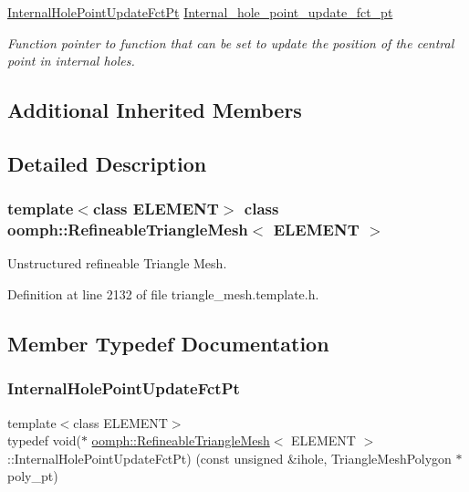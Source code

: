 \begin{DoxyCompactItemize}
\hyperlink{classoomph_1_1RefineableTriangleMesh_aa6831f42aa1941f4ae0b9186d01f9d7c}{Internal\+Hole\+Point\+Update\+Fct\+Pt} \hyperlink{classoomph_1_1RefineableTriangleMesh_a64228789345c2ef62942f66058c96a5e}{Internal\+\_\+hole\+\_\+point\+\_\+update\+\_\+fct\+\_\+pt}
\begin{DoxyCompactList}\small\item\em Function pointer to function that can be set to update the position of the central point in internal holes. \end{DoxyCompactList}\end{DoxyCompactItemize}
\subsection*{Additional Inherited Members}


\subsection{Detailed Description}
\subsubsection*{template$<$class E\+L\+E\+M\+E\+NT$>$\newline
class oomph\+::\+Refineable\+Triangle\+Mesh$<$ E\+L\+E\+M\+E\+N\+T $>$}

Unstructured refineable Triangle Mesh. 

Definition at line 2132 of file triangle\+\_\+mesh.\+template.\+h.



\subsection{Member Typedef Documentation}
\mbox{\label{classoomph_1_1RefineableTriangleMesh_aa6831f42aa1941f4ae0b9186d01f9d7c}} 
\subsubsection{\texorpdfstring{Internal\+Hole\+Point\+Update\+Fct\+Pt}{InternalHolePointUpdateFctPt}}
{\footnotesize\ttfamily template$<$class E\+L\+E\+M\+E\+NT$>$ \\
typedef void($\ast$ \hyperlink{classoomph_1_1RefineableTriangleMesh}{oomph\+::\+Refineable\+Triangle\+Mesh}$<$ E\+L\+E\+M\+E\+NT $>$\+::Internal\+Hole\+Point\+Update\+Fct\+Pt) (const unsigned \&ihole, Triangle\+Mesh\+Polygon $\ast$poly\+\_\+pt)}



